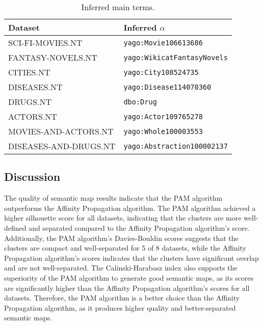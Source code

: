 \documentclass{ieeeaccess}
\begin{document}
\begin{table}[!h]
    \caption{Inferred main terms.}
    \label{tab:inferred_alphas}
    \centering
    \begin{tabular}{lL{4cm}}
         \toprule
         \textbf{Dataset} & 
         \textbf{Inferred $\alpha$} \\
         \midrule
         \footnotesize SCI-FI-MOVIES.NT & 
         \footnotesize\texttt{yago:Movie106613686} \\ 
         \footnotesize FANTASY-NOVELS.NT &
         \footnotesize\texttt{yago:WikicatFantasyNovels} \\
         \footnotesize CITIES.NT & 
         \footnotesize\texttt{yago:City108524735} \\
         \footnotesize DISEASES.NT & 
         \footnotesize\texttt{yago:Disease114070360} \\
         \footnotesize DRUGS.NT & 
         \footnotesize\texttt{dbo:Drug} \\
         \footnotesize ACTORS.NT & 
         \footnotesize\texttt{yago:Actor109765278} \\
         \footnotesize MOVIES-AND-ACTORS.NT & 
         \footnotesize\texttt{yago:Whole100003553} \\
         \footnotesize DISEASES-AND-DRUGS.NT & 
         \footnotesize\texttt{yago:Abstraction100002137} \\ 
         \bottomrule
    \end{tabular}
\end{table}


\subsection{Discussion}
The quality of semantic map results indicate that the PAM
algorithm outperforms the Affinity Propagation algorithm. The
PAM  algorithm achieved a higher silhouette score for all
datasets, indicating that the clusters are more well-defined and
separated compared to the Affinity Propagation algorithm's score.
Additionally, the PAM algorithm's Davies-Bouldin scores suggests 
that the clusters are compact and well-separated for 5 of 8 
datasets, while the Affinity Propagation algorithm's scores
indicates that the clusters have significant overlap and are 
not well-separated. The Calinski-Harabasz index also supports
the superiority of the PAM algorithm to generate good semantic
maps, as its scores are significantly higher than the Affinity 
Propagation algorithm's scores for all datasets. Therefore, the 
PAM algorithm is a better choice than the Affinity Propagation
algorithm, as it produces higher quality and better-separated
semantic maps.
\end{document}
